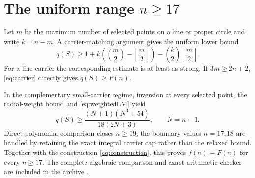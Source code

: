 \section{The uniform range $n\ge17$}

Let $m$ be the maximum number of selected points on a line or proper circle and write $k=n-m$.  A carrier-matching argument gives the uniform lower bound
\begin{equation}\label{eq:carrier}
 q(S)\ge 1+k\left(\binom m2-\left\lfloor\frac m2\right\rfloor\right)
 -\binom k2\left\lfloor\frac m2\right\rfloor.
\end{equation}
For a line carrier the corresponding estimate is at least as strong.  If $3m\ge2n+2$, \cref{eq:carrier} directly gives $q(S)\ge F(n)$.

In the complementary small-carrier regime, inversion at every selected point, the radial-weight bound and \cref{eq:weightedLM} yield
\begin{equation}\label{eq:globalq}
 q(S)\ge \frac{(N+1)(N^3+54)}{18(2N+3)},\qquad N=n-1.
\end{equation}
Direct polynomial comparison closes $n\ge19$; the boundary values $n=17,18$ are handled by retaining the exact integral carrier cap rather than the relaxed bound.  Together with the construction \cref{eq:construction}, this proves $f(n)=F(n)$ for every $n\ge17$.  The complete algebraic comparison and exact arithmetic checker are included in the archive \cite{verificationarchive}.

